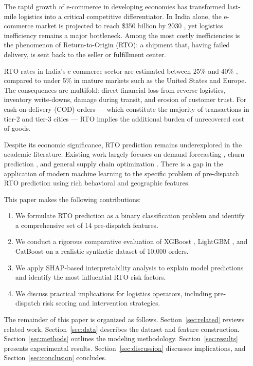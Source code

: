 \documentclass[conference]{IEEEtran}
\begin{document}
The rapid growth of e-commerce in developing economies has transformed last-mile logistics into a critical competitive differentiator. In India alone, the e-commerce market is projected to reach \$350 billion by 2030 \cite{nasscom2023}, yet logistics inefficiency remains a major bottleneck. Among the most costly inefficiencies is the phenomenon of Return-to-Origin (RTO): a shipment that, having failed delivery, is sent back to the seller or fulfillment center.

RTO rates in India's e-commerce sector are estimated between 25\% and 40\% \cite{shiprocket2022}, compared to under 5\% in mature markets such as the United States and Europe. The consequences are multifold: direct financial loss from reverse logistics, inventory write-downs, damage during transit, and erosion of customer trust. For cash-on-delivery (COD) orders — which constitute the majority of transactions in tier-2 and tier-3 cities — RTO implies the additional burden of unrecovered cost of goods.

Despite its economic significance, RTO prediction remains underexplored in the academic literature. Existing work largely focuses on demand forecasting \cite{carbonneau2008}, churn prediction \cite{verbeke2012}, and general supply chain optimization \cite{lambert2000}. There is a gap in the application of modern machine learning to the specific problem of pre-dispatch RTO prediction using rich behavioral and geographic features.

This paper makes the following contributions:
\begin{enumerate}
    \item We formulate RTO prediction as a binary classification problem and identify a comprehensive set of 14 pre-dispatch features.
    \item We conduct a rigorous comparative evaluation of XGBoost \cite{chen2016}, LightGBM \cite{ke2017}, and CatBoost \cite{prokhorenkova2018} on a realistic synthetic dataset of 10,000 orders.
    \item We apply SHAP-based interpretability analysis to explain model predictions and identify the most influential RTO risk factors.
    \item We discuss practical implications for logistics operators, including pre-dispatch risk scoring and intervention strategies.
\end{enumerate}

The remainder of this paper is organized as follows. Section~\ref{sec:related} reviews related work. Section~\ref{sec:data} describes the dataset and feature construction. Section~\ref{sec:methods} outlines the modeling methodology. Section~\ref{sec:results} presents experimental results. Section~\ref{sec:discussion} discusses implications, and Section~\ref{sec:conclusion} concludes.
\end{document}
